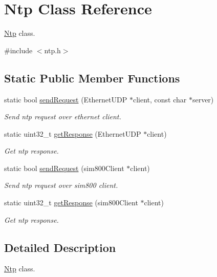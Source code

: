 \hypertarget{classNtp}{}\section{Ntp Class Reference}
\label{classNtp}


\hyperlink{classNtp}{Ntp} class.  




{\ttfamily \#include $<$ntp.\+h$>$}

\subsection*{Static Public Member Functions}
\begin{DoxyCompactItemize}
\item 
static bool \hyperlink{classNtp_a439e0498ea9209f74d91d7cf4d8805b0}{send\+Request} (Ethernet\+U\+DP $\ast$client, const char $\ast$server)
\begin{DoxyCompactList}\small\item\em Send ntp request over ethernet client. \end{DoxyCompactList}\item 
static uint32\+\_\+t \hyperlink{classNtp_a6df9e799d7fb829ff163ea14a70f6999}{get\+Response} (Ethernet\+U\+DP $\ast$client)
\begin{DoxyCompactList}\small\item\em Get ntp response. \end{DoxyCompactList}\item 
static bool \hyperlink{classNtp_a98c5dfc44e09069f5ec607adba8177b2}{send\+Request} (sim800\+Client $\ast$client)
\begin{DoxyCompactList}\small\item\em Send ntp request over sim800 client. \end{DoxyCompactList}\item 
static uint32\+\_\+t \hyperlink{classNtp_a6456f082f6b3012f72c5064e45791ddd}{get\+Response} (sim800\+Client $\ast$client)
\begin{DoxyCompactList}\small\item\em Get ntp response. \end{DoxyCompactList}\end{DoxyCompactItemize}


\subsection{Detailed Description}
\hyperlink{classNtp}{Ntp} class. 

